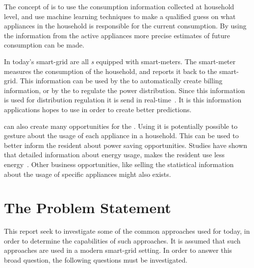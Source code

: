 The concept of  is to use the consumption information collected at household level, and use machine learning techniques to make a qualified guess on what appliances in the household is responsible for the current consumption. By using the information from the active appliances more precise estimates of future consumption can be made. 

In today's smart-grid are all \textit{s} equipped with smart-meters. The smart-meter measures the consumption of the household, and reports it back to the smart-grid. This information can be used by the  to automatically create billing information, or by the  to regulate the power distribution. Since this information is used for distribution regulation it is send in real-time~\citep{RefWorks:41}. It is this information  applications hopes to use in order to create better predictions.

 can also create many opportunities for the . Using  it is potentially possible to gesture about the usage of each appliance in a household. This can be used to better inform the resident about power saving opportunities. Studies have shown that detailed information about energy usage, makes the resident use less energy~\citep{RefWorks:33}. Other business opportunities, like selling the statistical information about the usage of specific appliances might also exists.  

\section{The Problem Statement}

This report seek to investigate some of the common approaches used for  today, in order to determine the capabilities of such approaches. It is assumed that such approaches are used in a modern smart-grid setting. In order to answer this broad question, the following questions must be investigated. 

